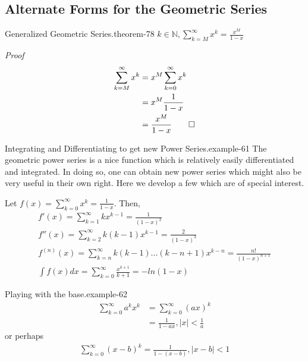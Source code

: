 \documentclass[10pt,]{book}
\makeatletter
\renewcommand*{\proofname}{Proof}
\renewenvironment{proof}[1][\proofname]{\par
  \pushQED{\qed}%
  \normalfont \topsep6\p@\@plus6\p@\relax
  \trivlist
  \item\relax
    {\itshape
    #1\@addpunct{.}}\hspace\labelsep\ignorespaces
}{%
  \popQED\endtrivlist\@endpefalse
}
\numberwithin{equation}{section}
\newcommand{\lt}{<}
\makeatother
\begin{document}
\subsection[{Alternate Forms for the Geometric Series}]{Alternate Forms for the Geometric Series}\label{subsection-8}
\begin{theorem}{Generalized Geometric Series.}{}{theorem-78}%
\(k \in \mathbb{N}, \sum_{k=M}^{\infty} {x^k} = \frac{x^M}{1-x}\)\end{theorem}
\begin{proof}\hypertarget{proof-77}{}
%
\begin{align*}
\sum_{k=M}^{\infty} {x^k} & = x^M \sum_{k=0}^{\infty} {x^k}\\
& = x^M \frac{1}{1-x}\\
& = \frac{x^M}{1-x}\qedhere
\end{align*}
\end{proof}
\begin{example}{Integrating and Differentiating to get new Power Series.}{example-61}%
\hypertarget{p-1529}{}%
The geometric power series is a nice function which is relatively easily differentiated and integrated. In doing so, one can obtain new power series which might also be very useful in their own right.  Here we develop a few which are of special interest.%
\par
\hypertarget{p-1530}{}%
Let \(f(x) = \sum_{k=0}^\infty x^k = \frac{1}{1-x}\).  Then,%
%
\begin{gather*}
f'(x) = \sum_{k=1}^{\infty} {kx^{k-1}} = \frac{1}{(1-x)^2}\\
f''(x) = \sum_{k=2}^{\infty} {k(k-1)x^{k-1}} = \frac{2}{(1-x)^3}\\
f^{(n)}(x) = \sum_{k=n}^{\infty} {k(k-1)...(k-n+1)x^{k-n}} = \frac{n!}{(1-x)^{n+1}}\\
\int f(x) dx = \sum_{k=0}^{\infty} {\frac{x^{k+1}}{k+1}} = -ln(1-x)
\end{gather*}
\end{example}
\begin{example}{Playing with the base.}{example-62}%
%
\begin{align*}
\sum_{k=0}^{\infty} {a^k x^k} & = \sum_{k=0}^{\infty} {(ax)^k}\\
& = \frac{1}{1-ax}, |x| \lt \frac{1}{a}
\end{align*}
\hypertarget{p-1531}{}%
or perhaps%
%
\begin{gather*}
\sum_{k=0}^{\infty} {(x-b)^k} = \frac{1}{1-(x-b)}, |x-b| \lt 1
\end{gather*}
\end{example}
\end{document}
